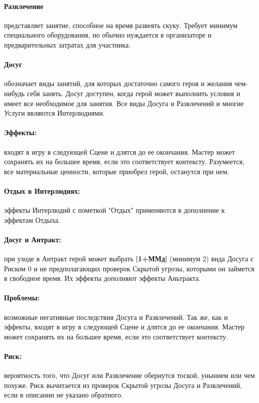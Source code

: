 \paragraph{Развлечение} представляет занятие, способное на время развеять скуку. Требует минимум специального оборудования, но обычно нуждается в организаторе и предварительных затратах для участника. 
\paragraph{Досуг} обозначает виды занятий, для которых достаточно самого героя и желания чем-нибудь себя занять. Досуг доступен, когда герой может выполнить условия и имеет все необходимое для занятия.
\newline Все виды Досуга и Развлечений и многие Услуги являются Интерлюдиями.

\paragraph{Эффекты:} входят в игру в следующей Сцене и длятся до ее окончания. Мастер может сохранять их на большее время, если это соответствует контексту. Разумеется, все материальные ценности, которые приобрел герой, останутся при нем.
\paragraph{Отдых в Интерлюдиях:} эффекты Интерлюдий с пометкой "Отдых" применяются в дополнение к эффектам Отдыха.
\paragraph{Досуг и Антракт:} при уходе в Антракт герой может выбрать \textbf{|1+ММд|} (минимум 2) вида Досуга с Риском 0 и не предполагающих проверок Скрытой угрозы, которыми он займется в свободное время. Их эффекты дополняют эффекты Аньтракта.
\paragraph{Проблемы:} возможные негативные последствия Досуга и Развлечений. Так же, как и эффекты, входят в игру в следующей Сцене и длятся до ее окончания. Мастер может сохранять их на большее время, если это соответствует контексту.
\paragraph{Риск:} вероятность того, что Досуг или Развлечение обернутся тоской, унынием или чем похуже. Риск вычитается из проверок Скрытой угрозы Досуга и Развлечений, если в описании не указано обратного.
